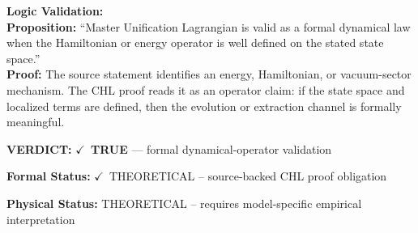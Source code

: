 \textbf{Logic Validation:}\\
\textbf{Proposition:} ``Master Unification Lagrangian is valid as a formal dynamical law when the Hamiltonian or
energy operator is well defined on the stated state space.''\\
\textbf{Proof:} The source statement identifies an energy, Hamiltonian, or vacuum-sector mechanism. The
CHL proof reads it as an operator claim: if the state space and localized terms are
defined, then the evolution or extraction channel is formally meaningful.

\textbf{VERDICT:} \ensuremath{\checkmark}\ \textbf{TRUE} --- formal dynamical-operator validation

\textbf{Formal Status:} \ensuremath{\checkmark}\ THEORETICAL -- source-backed CHL proof obligation

\textbf{Physical Status:} THEORETICAL -- requires model-specific empirical interpretation
\par\vspace{0.45em}
\par
\ifTZPDarkEdition
{}
\fi
\endgroup
\endgroup
